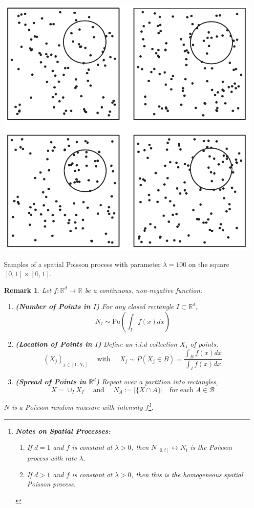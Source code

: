 \documentclass{tufte-handout}
\newtheorem{rmk}[thm]{Remark}
\begin{document}
\begin{marginfigure}
 \begin{center}
      \includegraphics[width=\textwidth]{fig-22.png}
      \caption{Samples of a spatial Poisson process with parameter $\lambda = 100$ on the square $[0,1] \times [0,1]$.}
  \end{center}
\end{marginfigure}

\begin{rmk}
  Let $f: \mathbb{R}^d \rightarrow \mathbb{R}$ be a continuous, non-negative function.
  \begin{enumerate}
    \item \textbf{(Number of Points in $I$)} For any closed rectangle $I \subset \mathbb{R}^d$,
    \[N_I \sim \text{Po}\left(\int_I f(x) d x\right)\]
    \item \textbf{(Location of Points in $I$)} Define an i.i.d collection $X_I$ of points,
    \[(X_j)_{j \in [1,N_I]} \quad \text{ with } \quad X_j \sim P(X_j \in B) = \frac{\int_B f(x) d x}{\int_I f(x) d x}\]
    \item \textbf{(Spread of Points in $\mathbb{R}^d$)} Repeat over a partition into rectangles,
    \[X = \cup_I X_I \quad \text{ and } \quad N_A := |\{X \cap A\}| \quad \text{for each $A \in \mathcal{B}$}\]
  \end{enumerate}
  \noindent $N$ is a Poisson random measure with intensity $f$\footnote{
  \textbf{Notes on Spatial Processes:}
  \begin{enumerate}
    \item If $d = 1$ and $f$ is constant at $\lambda > 0$, then $N_{[0,t]} \leftrightarrow N_t$ is the Poisson process with rate $\lambda$.
    \item If $d > 1$ and $f$ is constant at $\lambda > 0$, then this is the homogeneous spatial Poisson process.
  \end{enumerate}
  }.
\end{rmk}
\end{document}
